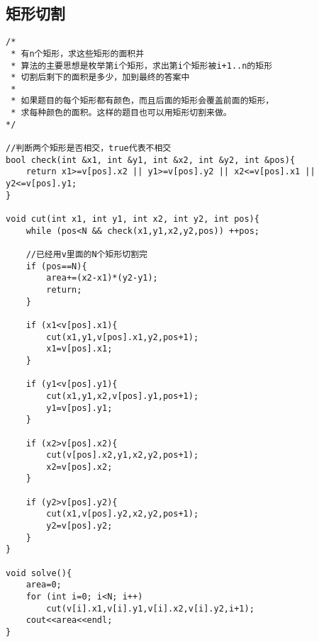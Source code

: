 \subsection{矩形切割}
\begin{verbatim}
/*
 * 有n个矩形，求这些矩形的面积并
 * 算法的主要思想是枚举第i个矩形，求出第i个矩形被i+1..n的矩形
 * 切割后剩下的面积是多少，加到最终的答案中
 * 
 * 如果题目的每个矩形都有颜色，而且后面的矩形会覆盖前面的矩形，
 * 求每种颜色的面积。这样的题目也可以用矩形切割来做。
*/

//判断两个矩形是否相交，true代表不相交
bool check(int &x1, int &y1, int &x2, int &y2, int &pos){
    return x1>=v[pos].x2 || y1>=v[pos].y2 || x2<=v[pos].x1 || y2<=v[pos].y1;
}

void cut(int x1, int y1, int x2, int y2, int pos){
    while (pos<N && check(x1,y1,x2,y2,pos)) ++pos;

    //已经用v里面的N个矩形切割完
    if (pos==N){
        area+=(x2-x1)*(y2-y1);
        return;
    }

    if (x1<v[pos].x1){
        cut(x1,y1,v[pos].x1,y2,pos+1);
        x1=v[pos].x1;
    }

    if (y1<v[pos].y1){
        cut(x1,y1,x2,v[pos].y1,pos+1);
        y1=v[pos].y1;
    }

    if (x2>v[pos].x2){
        cut(v[pos].x2,y1,x2,y2,pos+1);
        x2=v[pos].x2;
    }

    if (y2>v[pos].y2){
        cut(x1,v[pos].y2,x2,y2,pos+1);
        y2=v[pos].y2;
    }
}

void solve(){
    area=0;
    for (int i=0; i<N; i++)
        cut(v[i].x1,v[i].y1,v[i].x2,v[i].y2,i+1);
    cout<<area<<endl;
}
\end{verbatim}
